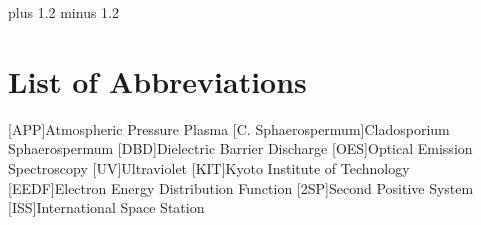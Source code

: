 \documentclass[fontsize=11pt]{scrreprt}
\author{Lorenz Saalmann}
\begin{document}
\font plus 1.2\font
minus 1.2\font



\setcounter{page}{1}



\cleardoublepage

\tableofcontents
\cleardoublepage

\listoffigures
\listoftables
\section*{\huge List of Abbreviations}
\begin{acronym}
  [APP]{\dotfill Atmospheric Pressure Plasma}   
  [C. Sphaerospermum]{\dotfill Cladosporium Sphaerospermum}   
  [DBD]{\dotfill Dielectric Barrier Discharge}
  [OES]{\dotfill Optical Emission Spectroscopy}
  [UV]{\dotfill Ultraviolet}
  [KIT]{\dotfill Kyoto Institute of Technology}
  [EEDF]{\dotfill Electron Energy Distribution Function}
  [2SP]{\dotfill Second Positive System}
  [ISS]{\dotfill International Space Station}

\end{acronym}
\cleardoublepage

\onehalfspacing

\cleardoublepage









\cleardoublepage
\renewcommand\bibname{References}
{}
\printbibliography
\cleardoublepage


\fontsize{12pt}{12pt}\selectfont
\clearpage
\end{document}
